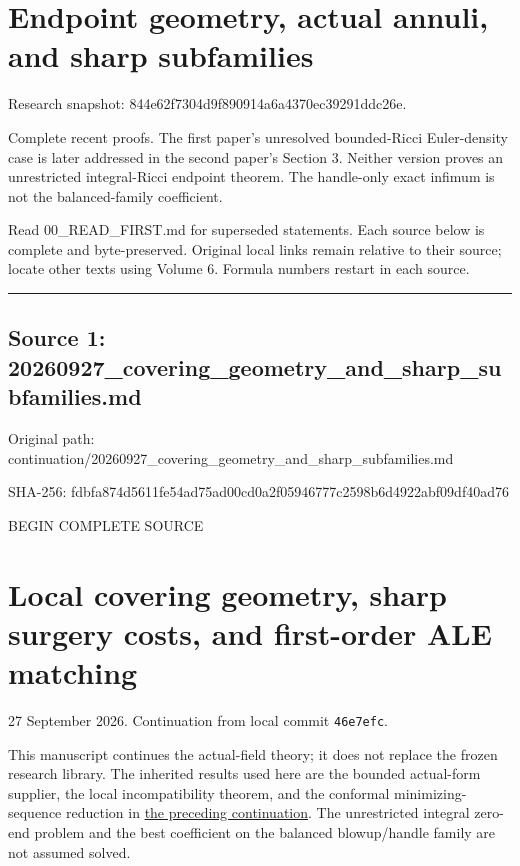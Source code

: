 \documentclass[
  10pt,
]{article}
\author{}
\date{}
\begin{document}
\hypertarget{endpoint-geometry-actual-annuli-and-sharp-subfamilies}{%
\section{Endpoint geometry, actual annuli, and sharp
subfamilies}\label{endpoint-geometry-actual-annuli-and-sharp-subfamilies}}

Research snapshot: 844e62f7304d9f890914a6a4370ec39291ddc26e.

Complete recent proofs. The first paper's unresolved bounded-Ricci
Euler-density case is later addressed in the second paper's Section 3.
Neither version proves an unrestricted integral-Ricci endpoint theorem.
The handle-only exact infimum is not the balanced-family coefficient.

Read 00\_READ\_FIRST.md for superseded statements. Each source below is
complete and byte-preserved. Original local links remain relative to
their source; locate other texts using Volume 6. Formula numbers restart
in each source.

\begin{center}\rule{0.5\linewidth}{0.5pt}\end{center}

\hypertarget{source-1-20260927_covering_geometry_and_sharp_subfamilies.md}{%
\subsection{Source 1:
20260927\_covering\_geometry\_and\_sharp\_subfamilies.md}\label{source-1-20260927_covering_geometry_and_sharp_subfamilies.md}}

Original path:
continuation/20260927\_covering\_geometry\_and\_sharp\_subfamilies.md

SHA-256:
fdbfa874d5611fe54ad75ad00cd0a2f05946777c2598b6d4922abf09df40ad76

BEGIN COMPLETE SOURCE

\hypertarget{local-covering-geometry-sharp-surgery-costs-and-first-order-ale-matching}{%
\section{Local covering geometry, sharp surgery costs, and first-order
ALE
matching}\label{local-covering-geometry-sharp-surgery-costs-and-first-order-ale-matching}}

27 September 2026. Continuation from local commit \texttt{46e7efc}.

This manuscript continues the actual-field theory; it does not replace
the frozen research library. The inherited results used here are the
bounded actual-form supplier, the local incompatibility theorem, and the
conformal minimizing-sequence reduction in
\href{20260927_conformal_separation_and_zero_end.md}{the preceding
continuation}. The unrestricted integral zero-end problem and the best
coefficient on the balanced blowup/handle family are not assumed solved.
\end{document}
